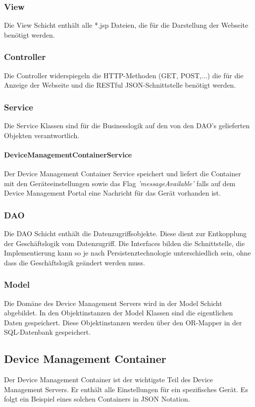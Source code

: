 \subsubsection{View}
Die View Schicht enthält alle *.jsp Dateien, die für die Darstellung der Webseite benötigt werden. 

\subsubsection{Controller}
Die Controller widerspiegeln die HTTP-Methoden (GET, POST,...) die für die Anzeige der Webseite und die RESTful JSON-Schnittstelle benötigt werden.

\subsubsection{Service}
Die Service Klassen sind für die Businesslogik auf den von den DAO's gelieferten Objekten verantwortlich.

\paragraph{DeviceManagementContainerService}
Der Device Management Container Service speichert und liefert die Container mit den Geräteeinstellungen sowie das Flag \textit{'messageAvailable'} falls auf dem Device Management Portal eine Nachricht für das Gerät vorhanden ist.

\subsubsection{DAO}
Die DAO Schicht enthält die Datenzugriffsobjekte. Diese dient zur Entkopplung der Geschäftslogik vom Datenzugriff. Die Interfaces bilden die Schnittstelle, die Implementierung kann so je nach Persistenztechnologie unterschiedlich sein, ohne dass die Geschäftslogik geändert werden muss.


\subsubsection{Model}
Die Domäne des Device Management Servers wird in der Model Schicht abgebildet. In den Objektinstanzen der Model Klassen sind die eigentlichen Daten gespeichert. Diese Objektinstanzen werden über den OR-Mapper in der SQL-Datenbank gespeichert.

\subsection{Device Management Container}
Der Device Management Container ist der wichtigste Teil des Device Management Servers. Er enthält alle Einstellungen für ein spezifisches Gerät. Es folgt ein Beispiel eines solchen Containers in JSON Notation.

